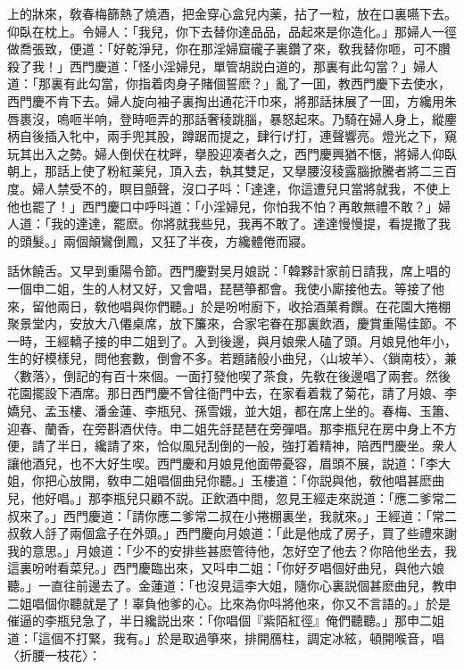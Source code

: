 上的牀來，敎春梅篩熱了燒酒，把金穿心盒兒内薬，拈了一粒，放在口裏嚥下去。仰臥在枕上。令婦人：「我兒，你下去替你達品品，品起來是你造化。」那婦人一徑做喬張致，便道：「好乾淨兒，你在那淫婦窟礲子裏鑽了來，敎我替你咂，可不臢殺了我！」西門慶道：「怪小淫婦兒，單管胡説白道的，那裏有此勾當？」婦人道：「那裏有此勾當，你指着肉身子賭個誓麽？」亂了一囬，教西門慶下去使水，西門慶不肯下去。婦人旋向袖子裏掏出通花汗巾來，將那話抹展了一囬，方纔用朱唇裹沒，嗚咂半响，登時咂弄的那話奢稜跳腦，暴怒起來。乃騎在婦人身上，縱麈柄自後插入牝中，兩手兜其股，蹲踞而提之，肆行げ打，連聲響亮。燈光之下，窺玩其出入之勢。婦人倒伏在枕畔，擧股迎凑者久之，西門慶興猶不愜，將婦人仰臥朝上，那話上使了粉紅薬兒，頂入去，執其雙足，又擧腰沒稜露腦掀騰者將二三百度。婦人禁受不的，瞑目顫聲，沒口子呌：「達達，你這遭兒只當將就我，不使上他也罷了！」西門慶口中呼呌道：「小淫婦兒，你怕我不怕？再敢無禮不敢？」婦人道：「我的達達，罷麽。你將就我些兒，我再不敢了。達達慢慢提，看提撒了我的頭髮。」兩個顛鸞倒鳳，又狂了半夜，方纔體倦而寢。

話休饒舌。又早到重陽令節。西門慶對吴月娘説：「韓夥計家前日請我，席上唱的一個申二姐，生的人材又好，又會唱，琵琶箏都會。我使小廝接他去。等接了他來，留他兩日，敎他唱與你們聽。」於是吩咐廚下，收拾酒菓肴饌。在花園大捲棚聚景堂内，安放大八僊桌席，放下簾來，合家宅眷在那裏飲酒，慶賞重陽佳節。不一時，王經轎子接的申二姐到了。入到後邊，與月娘衆人磕了頭。月娘見他年小，生的好模樣兒，問他套數，倒會不多。若題諸般小曲兒，〈山坡羊〉、〈鎖南枝〉，兼〈數落〉，倒記的有百十來個。一面打發他喫了茶食，先敎在後邊唱了兩套。然後花園擺設下酒席。那日西門慶不曾往衙門中去，在家看着栽了菊花，請了月娘、李嬌兒、孟玉樓、潘金蓮、李瓶兒、孫雪娥，並大姐，都在席上坐的。春梅、玉簫、迎春、蘭香，在旁斟酒伏侍。申二姐先㧱琵琶在旁彈唱。那李瓶兒在房中身上不方便，請了半日，纔請了來，恰似風兒刮倒的一般，強打着精神，陪西門慶坐。衆人讓他酒兒，也不大好生喫。西門慶和月娘見他面帶憂容，眉頭不展，説道：「李大姐，你把心放開，敎申二姐唱個曲兒你聽。」玉樓道：「你説與他，敎他唱甚麽曲兒，他好唱。」那李瓶兒只顧不説。正飲酒中間，忽見王經走來説道：「應二爹常二叔來了。」西門慶道：「請你應二爹常二叔在小捲棚裏坐，我就來。」王經道：「常二叔敎人㧱了兩個盒子在外頭。」西門慶向月娘道：「此是他成了房子，買了些禮來謝我的意思。」月娘道：「少不的安排些甚麽管待他，怎好空了他去？你陪他坐去，我這裏吩咐看菜兒。」西門慶臨出來，又呌申二姐：「你好歹唱個好曲兒，與他六娘聽。」一直往前邊去了。金蓮道：「也沒見這李大姐，隨你心裏説個甚麽曲兒，教申二姐唱個你聽就是了！辜負他爹的心。比來為你呌將他來，你又不言語的。」於是催逼的李瓶兒急了，半日纔説出來：「你唱個『紫陌紅徑』俺們聽聽。」那申二姐道：「這個不打緊，我有。」於是取過箏來，排開鴈柱，調定冰絃，頓開喉音，唱〈折腰一枝花〉：

